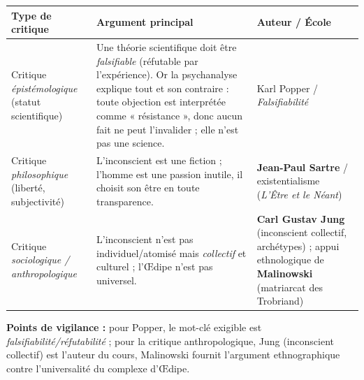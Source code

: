 \documentclass[11pt]{article}
\begin{document}
\begin{corrige}
\begin{center}
\begin{tabularx}{\linewidth}{|l|X|X|}\hline
\rowcolor{popblueL}\textbf{Type de critique} & \textbf{Argument principal} & \textbf{Auteur / École} \\ \hline
Critique \emph{épistémologique} (statut scientifique) & Une théorie scientifique doit être \emph{falsifiable} (réfutable par l'expérience). Or la psychanalyse explique tout et son contraire : toute objection est interprétée comme « résistance », donc aucun fait ne peut l'invalider ; elle n'est pas une science. & Karl Popper / \emph{Falsifiabilité} \\ \hline
Critique \emph{philosophique} (liberté, subjectivité) & L'inconscient est une fiction ; l'homme est une passion inutile, il choisit son être en toute transparence. & \textbf{Jean-Paul Sartre} / existentialisme (\emph{L'Être et le Néant}) \\ \hline
Critique \emph{sociologique / anthropologique} & L'inconscient n'est pas individuel/atomisé mais \emph{collectif} et culturel ; l'Œdipe n'est pas universel. & \textbf{Carl Gustav Jung} (inconscient collectif, archétypes) ; appui ethnologique de \textbf{Malinowski} (matriarcat des Trobriand) \\ \hline
\end{tabularx}
\end{center}
\textbf{Points de vigilance :} pour Popper, le mot-clé exigible est \emph{falsifiabilité/réfutabilité} ; pour la critique anthropologique, Jung (inconscient collectif) est l'auteur du cours, Malinowski fournit l'argument ethnographique contre l'universalité du complexe d'Œdipe.
\end{corrige}
\end{document}
